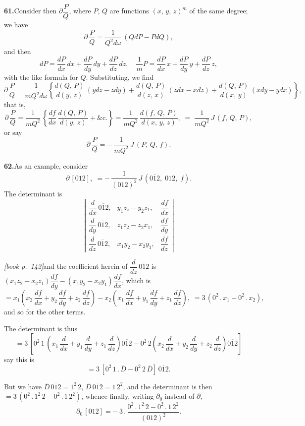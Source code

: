 \documentclass[11pt,a4paper]{article}
\theoremstyle{plain}
\theoremstyle{definition}
\theoremstyle{remark}
\providecommand{\bdet}[1]{\overline{#1}}
\begin{document}
\medskip\noindent\textbf{61.}\quad Consider then $\partial \dfrac{P}{Q}$, where $P$, $Q$ are functions $(x,\,y,\,z)^m$ of the same degree; we have
\[
\partial\,\frac{P}{Q} = \frac{1}{Q^2 d\omega}\,(QdP - PdQ),
\]
and then
\[
dP = \frac{dP}{dx}\,dx + \frac{dP}{dy}\,dy + \frac{dP}{dz}\,dz,\quad \frac{1}{m}P = \frac{dP}{dx}\,x + \frac{dP}{dy}\,y + \frac{dP}{dz}\,z,
\]
with the like formula for $Q$. Substituting, we find
\[
\partial\,\frac{P}{Q} = \frac{1}{mQ^2 d\omega}\left\{\frac{d(Q,\,P)}{d(y,\,z)}\,(ydz - zdy) + \frac{d(Q,\,P)}{d(z,\,x)}\,(zdx - xdz) + \frac{d(Q,\,P)}{d(x,\,y)}\,(xdy - ydx)\right\},
\]
that is,
\[
\partial\,\frac{P}{Q} = \frac{1}{mQ^2}\,\left\{\frac{df}{dx}\,\frac{d(Q,\,P)}{d(y,\,z)} + \&\text{c.}\right\} = \frac{1}{mQ^2}\,\frac{d(f,\,Q,\,P)}{d(x,\,y,\,z)},\;=\;\frac{1}{mQ^2}\,J\,(f,\,Q,\,P),
\]
or say
\[
\partial\,\frac{P}{Q} = -\,\frac{1}{mQ^2}\,J\,(P,\,Q,\,f).
\]

\medskip\noindent\textbf{62.}\quad As an example, consider
\[
\partial\,[012],\;= -\,\frac{1}{(012)^2}\,J\,(\bdet{012},\;012,\;f).
\]
The determinant is
\[
\left|\begin{array}{ccc}
\dfrac{d}{dx}\,\bdet{012}, & y_1z_z - y_2z_1, & \dfrac{df}{dx}\\[4pt]
\dfrac{d}{dy}\,\bdet{012}, & z_1z_2 - z_2x_1, & \dfrac{df}{dy}\\[4pt]
\dfrac{d}{dz}\,\bdet{012}, & x_1y_2 - x_2y_1, & \dfrac{df}{dz}
\end{array}\right|
\]

\medskip\noindent\textit{[book p.~142]}\quad and the coefficient herein of $\dfrac{d}{dz}\,\bdet{012}$ is $(x_1z_2 - x_2z_1)\dfrac{df}{dy} - (x_1y_2 - x_2y_1)\dfrac{df}{dx}$, which is
\[
= x_1\left(x_2\,\frac{df}{dx} + y_2\,\frac{df}{dy} + z_2\,\frac{df}{dz}\right) - x_2\left(x_1\,\frac{df}{dx} + y_1\,\frac{df}{dy} + z_1\,\frac{df}{dz}\right),\;= 3\,(0^{2}\,.\,x_1 - 0^{2}\,.\,x_2),
\]
and so for the other terms.

The determinant is thus
\[
= 3\,\left[0^{2}\,1\,\left(x_1\,\frac{d}{dx} + y_1\,\frac{d}{dy} + z_1\,\frac{d}{dz}\right)\bdet{012} - 0^{2}\,2\left(x_2\,\frac{d}{dx} + y_2\,\frac{d}{dy} + z_2\,\frac{d}{dz}\right)\bdet{012}\right]
\]
say this is
\[
= 3\,[0^{2}\,1\,.\,\bdet{D} - 0^{2}\,2\,\bdet{D}]\,\bdet{012}.
\]

But we have $\bdet{D}\,\bdet{012} = 1^{2}\,2$, $\bdet{D}\,\bdet{012} = 1\,2^{2}$, and the determinant is then $= 3\,(0^{2}\,.\,1^{2}\,2 - 0^{2}\,.\,1\,2^{2})$, whence finally, writing $\partial_0$ instead of $\partial$,
\[
\partial_0\,[012] = -\,3\,.\,\frac{0^{2}\,.\,1^{2}\,2 - 0^{2}\,.\,1\,2^{2}}{(012)^{2}}.
\]
\end{document}
